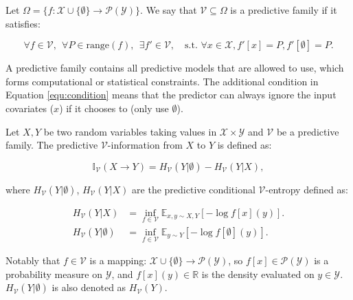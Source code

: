 \begin{definition}
	Let $\Omega=\{f:\mathcal{X}\cup\{\emptyset\}\rightarrow \mathcal{P}(\mathcal Y)\}$. We say that $\mathcal V \subseteq \Omega$ is a predictive family if it satisfies:
	\begin{small}
	\begin{equation}
	\label{equ:condition}
		\forall f\in\mathcal{V},\ \  \forall P\in \mathrm{range}(f),\ \  \exists f'\in\mathcal{V}, \quad\text{s.t. }\forall x\in\mathcal{X}, f'[x]=P, f'[\emptyset]=P.
	\end{equation}
	\end{small}
\end{definition}
A predictive family contains all predictive models that are allowed to use, which forms computational or statistical constraints.
The additional condition in Equation \ref{equ:condition} means that the predictor can always ignore the input covariates ($x$) if it chooses to (only use $\emptyset$).

\begin{definition}
\label{def:predictive_v_information}
	Let $X, Y$ be two random variables taking values in $\mathcal{X}\times\mathcal{Y}$ and $\mathcal V$ be a predictive family. The predictive $\mathcal V$-information from $X$ to $Y$ is defined as:
	\begin{small}
	\begin{equation}
		\mathbb{I}_{\mathcal V}(X\rightarrow Y) = H_{\mathcal V}(Y|\emptyset)-H_{\mathcal V}(Y|X),
	\end{equation}	
	\end{small}
	where $H_{\mathcal V}(Y|\emptyset)$, $H_{\mathcal V}(Y|X)$ are the predictive conditional $\mathcal V$-entropy defined as:
	\begin{small}
	\begin{align}
		H_{\mathcal V}(Y|X) &= \inf\limits_{f\in\mathcal{V}}\mathbb{E}_{x,y\sim X,Y}[-\log f[x](y)]. \\
		H_{\mathcal V}(Y|\emptyset) &= \inf\limits_{f\in\mathcal{V}}\mathbb{E}_{y\sim Y}[-\log f[\emptyset](y)].
	\end{align}	
	\end{small}
	Notably that $f\in\mathcal V$ is a mapping: $\mathcal{X}\cup\{\emptyset\}\rightarrow \mathcal{P}(\mathcal Y)$, so $f[x]\in\mathcal{P}(\mathcal{Y})$ is a probability measure on $\mathcal{Y}$, and $f[x](y)\in\mathbb{R}$ is the density evaluated on $y\in\mathcal Y$. $H_{\mathcal V}(Y|\emptyset)$ is also denoted as $H_{\mathcal V}(Y)$.
\end{definition}



